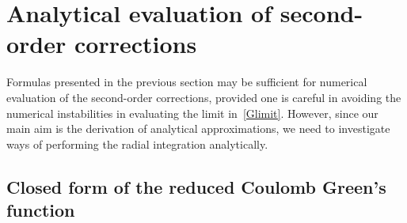 \chapter{Analytical evaluation of second-order corrections}
\label{ch:IntGreen}

Formulas presented in the previous section may be sufficient for numerical evaluation of the second-order corrections, provided one is careful in avoiding the numerical instabilities in evaluating the limit in~\eqref{Glimit}. However, since our main aim is the derivation of analytical approximations, we need to investigate ways of performing the radial integration analytically. 

\section{Closed form of the reduced Coulomb Green's function}

